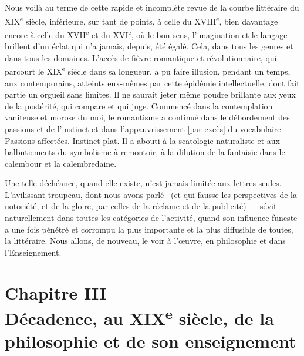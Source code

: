 \documentclass[french,twoside]{book} %
\newcommand\chapteropen{} %
\newcommand\chapterclose{} %
\begin{document}
Nous voilà au terme de cette rapide et incomplète revue de la courbe littéraire du XIX\textsuperscript{e} siècle, inférieure, sur tant de points, à celle du XVIII\textsuperscript{e}, bien davantage encore à celle du XVII\textsuperscript{e} et du XVI\textsuperscript{e}, où le bon sens, l’imagination et le langage brillent d’un éclat qui n’a jamais, depuis, été égalé. Cela, dans tous les genres et dans tous les domaines. L’accès de fièvre romantique et révolutionnaire, qui parcourt le XIX\textsuperscript{e} siècle dans sa longueur, a pu faire illusion, pendant un temps, aux contemporains, atteints eux-mêmes par cette épidémie intellectuelle, dont fait partie un orgueil sans limites. Il ne saurait jeter même poudre brillante aux yeux de la postérité, qui compare et qui juge. Commencé dans la contemplation vaniteuse et morose du moi, le romantisme a continué dans le débordement des passions et de l’instinct et dans l’appauvrissement [par excès] du vocabulaire. Passions affectées. Instinct plat. Il a abouti à la scatologie naturaliste et aux balbutiements du symbolisme à remontoir, à la dilution de la fantaisie dans le calembour et la calembredaine.\par
Une telle déchéance, quand elle existe, n’est jamais limitée aux lettres seules. L’avilissant troupeau, dont nous avons parlé  (et qui fausse les perspectives de la notoriété, et de la gloire, par celles de la réclame et de la publicité) — sévit naturellement dans toutes les catégories de l’activité, quand son influence funeste a une fois pénétré et corrompu la plus importante et la plus diffusible de toutes, la littéraire. Nous allons, de nouveau, le voir à l’œuvre, en philosophie et dans l’Enseignement.
\chapterclose


\chapteropen
\chapter[{Chapitre III. Décadence, au XIXe siècle, de la philosophie et de son enseignement}]{Chapitre III\\
Décadence, au XIX\textsuperscript{e} siècle, de la philosophie et de son enseignement}\renewcommand{\leftmark}{Chapitre III\\
Décadence, au XIX\textsuperscript{e} siècle, de la philosophie et de son enseignement}
\end{document}
